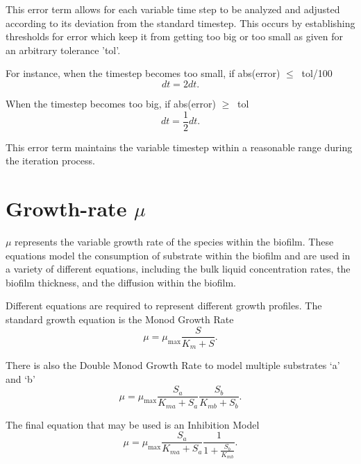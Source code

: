 \documentclass[letterpaper, twoside]{article}
\begin{document}
This error term allows for each variable time step to be analyzed and adjusted according to its deviation from the standard timestep. This occurs by establishing thresholds for error which keep it from getting too big or too small as given for an arbitrary tolerance 'tol'.

For instance, when the timestep becomes too small,  if abs(error) $ \leq\ $ tol/100
\begin{equation}
  dt = 2 dt.
\end{equation}

When the timestep becomes too big, if abs(error) $ \geq\ $ tol
\begin{equation}
  dt = \frac{1}{2} dt.
\end{equation}

This error term maintains the variable timestep within a reasonable range during the iteration process.







\section{Growth-rate $\mu$}\label{sec:mu}
$\mu$ represents the variable growth rate of the species within the biofilm. These equations model the consumption of substrate within the biofilm and are used in a variety of different equations, including the bulk liquid concentration rates, the biofilm thickness, and the diffusion within the biofilm.

Different equations are required to represent different growth profiles. The standard growth equation is the Monod Growth Rate
\begin{equation} \label{eq: MonodGrowthRate}
  \mu=\mu_\mathrm{max} \frac{S}{K_m + S}.
\end{equation}

There is also the Double Monod Growth Rate to model multiple substrates `a' and `b'
\begin{equation} \label{eq: DoubleMonodGrowthRate}
  \mu=\mu_\mathrm{max} \frac{S_a}{K_{ma} + S_a} \frac{S_b}{K_{mb} + S_b}.
\end{equation}

The final equation that may be used is an Inhibition Model
\begin{equation} \label{eq: Inhibition}
  \mu=\mu_\mathrm{max} \frac{S_a}{K_{ma} + S_a} \frac{1}{1 + \frac{S_b}{K_{mb}}}.
\end{equation}
\end{document}
